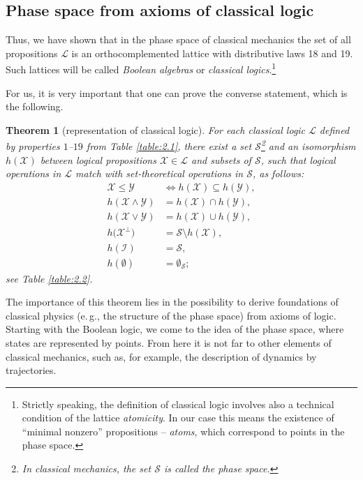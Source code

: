 \documentclass[nochecklpage]{stefan1}
\newtheorem{theorem}{Theorem}[chapter]
\theoremstyle{definition}
\begin{document}
\subsection{Phase space from axioms of classical logic}\label{sc:1.2.4}
Thus, we have shown that in the phase space of classical mechanics the
set of all propositions $\mathcal{L} $ is an orthocomplemented lattice
with distributive laws 18 and 19. Such lattices will be called
\emph{Boolean algebras} or \emph{classical logics}.\footnote{Strictly
speaking, the definition of classical logic involves also a technical
condition of the lattice \emph{atomicity}. In our case
this means the existence of ``minimal nonzero'' propositions --
\emph{atoms}, which correspond to points in the
phase space.}

For us, it is very important that one can prove the converse statement,
which is the following.

\begin{theorem}[representation of classical logic]
\label{Theorem4.13}
For each classical logic $ \mathcal{L} $ defined by properties $1$--$19$
from Table \ref{table:2.1}, there exist a set $ \mathcal{S}
$\footnote{In classical mechanics, the set $ \mathcal{S} $ is called
the \emph{phase space}.} and an isomorphism $ h(\mathcal{X}) $ between
logical propositions $\mathcal{X} \in \mathcal{L} $ and subsets of
$ \mathcal{S} $, such that logical operations in $ \mathcal{L} $ match
with set-theoretical operations in $ \mathcal{S}$, as follows:
%
\begin{align*}
\mathcal{X} \leq \mathcal{Y} &\Leftrightarrow h(\mathcal{X}) \subseteq h(
\mathcal{Y}),
\\
h(\mathcal{X} \wedge \mathcal{Y}) &= h(\mathcal{X}) \cap h( \mathcal{Y}),
\\
h(\mathcal{X} \vee \mathcal{Y}) &= h(\mathcal{X}) \cup h(\mathcal{Y}),
\\
h \bigl( \mathcal{X}^{\perp } \bigr) &= \mathcal{S} \setminus h(
\mathcal{X}),
\\
h(\mathcal{I}) &= \mathcal{S,}
\\
h(\emptyset ) &= \emptyset_{\mathcal{S}};
\end{align*}
%
see Table \ref{table:2.2}.
\end{theorem}

The importance of this theorem lies in the possibility to derive
foundations of classical physics (e.\,g., the structure of the phase
space) from axioms of logic. Starting with the Boolean logic, we come
to the idea of the phase space, where states are represented by points.
From here it is not far to other elements of classical mechanics, such
as, for example, the description of dynamics by trajectories.
\end{document}
